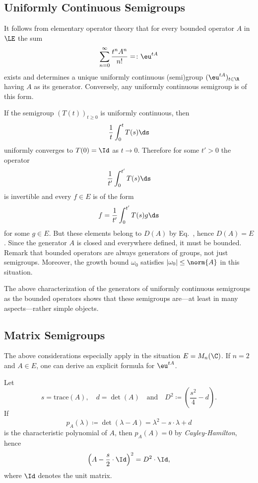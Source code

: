 \subsection{Uniformly Continuous Semigroups}\label{subsec:a1-2.1}%
It follows from elementary operator theory that for every bounded operator $A$ in  $\LE$ the sum
\[
    \sum_{n=0}^{\infty} \frac{t^{n}A^{n}}{n!} = \colon  \eu^{tA}
\]
exists and determines a unique uniformly continuous (semi)group $( \eu^{tA})_{t \in \R}$ having $A$ as its generator.
Conversely, any uniformly continuous semigroup is of this form.

If the semigroup $(T(t))_{t \geq 0}$ is uniformly continuous, then 
%
\[
	\frac{1}{t}\int_{0}^{t} T(s) \ds
\]
%
uniformly converges to $T(0) = \Id$ as $t \to 0$.
Therefore for some $t' > 0$ the operator 
%
\[
	\frac{1}{t'}\int_{0}^{t'} T(s) \ds
\]
%
is invertible and every $f \in E$ is of the form 
%
\[
	f = \frac{1}{t'}\int_{0}^{t'} T(s)g \ds
\]
%
for some $g \in E$.
But these elements belong to $D(A)$ by Eq.~, hence $D(A) = E$.
Since the generator $A$ is closed and everywhere defined, it must be bounded.
Remark that bounded operators are always generators of groups, not just semigroups.
Moreover, the growth bound $\omega_0$ satisfies $|\omega_0| \leq \norm{A}$ in this situation.

The above characterization of the generators of uniformly continuous semigroups as the bounded operators shows that these semigroups are---at least in many aspects---rather simple objects.
\subsection{Matrix Semigroups}\label{subsec:a1-2.2}%
The above considerations especially apply in the situation $E = M_{n}(\C)$.
If\/ $n = 2$ and $A \in E$, one can derive an explicit formula for $ \eu^{tA}$. 

Let %
\[
	s = \text{trace}(A), 
	\quad 
	d = \det(A) 
	\quad \text{and} \quad
	D^{2} \coloneqq \left( \frac{s^{2}}{4} - d \right).
\]
%
If   
\[
p_A(\lambda) \coloneqq \det(\lambda - A) = \lambda^2-s\cdot \lambda + d 
\]
is the characteristic polynomial  of\/ $ A $, then $ p_{A}(A) = 0 $ by \emph{Cayley-Hamilton}, hence
%
\[
	\left( A - \frac{s}{2} \cdot \Id \right)^{2} = D^{2} \cdot \Id , 
\]
%
where $ \Id $ denotes the unit matrix.

